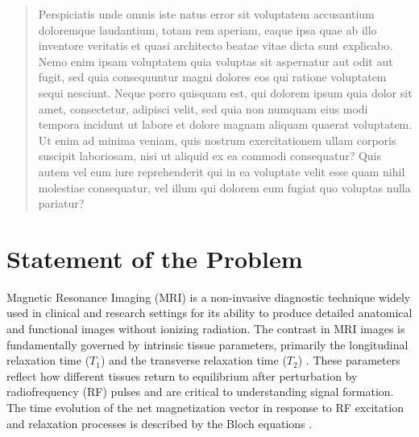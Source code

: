 \documentclass[10pt,a4paper,twoside]{article}
\begin{document}
\begin{abstract}
\noindent
Perspiciatis unde omnis iste natus error sit voluptatem accusantium doloremque laudantium, totam rem aperiam, eaque ipsa quae ab illo inventore veritatis et quasi architecto beatae vitae dicta sunt explicabo. Nemo enim ipsam voluptatem quia voluptas sit aspernatur aut odit aut fugit, sed quia consequuntur magni dolores eos qui ratione voluptatem sequi nesciunt. Neque porro quisquam est, qui dolorem ipsum quia dolor sit amet, consectetur, adipisci velit, sed quia non numquam eius modi tempora incidunt ut labore et dolore magnam aliquam quaerat voluptatem. Ut enim ad minima veniam, quis nostrum exercitationem ullam corporis suscipit laboriosam, nisi ut aliquid ex ea commodi consequatur? Quis autem vel eum iure reprehenderit qui in ea voluptate velit esse quam nihil molestiae consequatur, vel illum qui dolorem eum fugiat quo voluptas nulla pariatur?


\end{abstract}

\maketitle
\thispagestyle{titlestyle}

\section{Statement of the Problem}\label{sec:intro}
Magnetic Resonance Imaging (MRI) is a non-invasive diagnostic technique widely used in clinical and research settings for its ability to produce detailed anatomical and functional images without ionizing radiation. The contrast in MRI images is fundamentally governed by intrinsic tissue parameters, primarily the longitudinal relaxation time ($T_1$) and the transverse relaxation time ($T_2$) \cite{brown2014}. These parameters reflect how different tissues return to equilibrium after perturbation by radiofrequency (RF) pulses and are critical to understanding signal formation. The time evolution of the net magnetization vector in response to RF excitation and relaxation processes is described by the Bloch equations \cite{bloch1946}.
\end{document}
